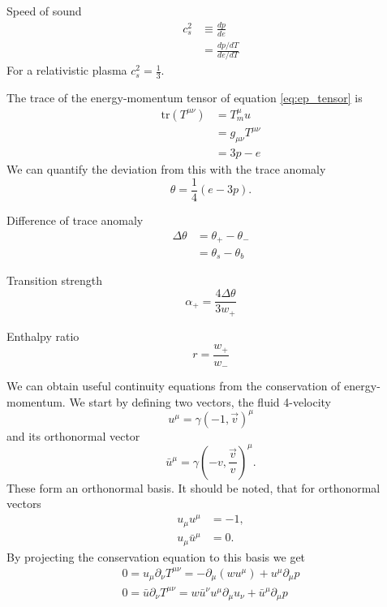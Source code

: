 Speed of sound
\cites[eq. 13]{giese_2020}[eq. 3]{giese_2021}
\begin{align}
c_s^2
&\equiv \frac{dp}{de} \\
&= \frac{dp/dT}{de/dT}
\end{align}
For a relativistic plasma $c_s^2=\frac{1}{3}$.

The trace of the energy-momentum tensor of equation \ref{eq:ep_tensor} is
\begin{align}
\text{tr} (T^{\mu \nu})
&= T^\mu_mu \\
&= g_{\mu \nu} T^{\mu \nu} \\
&=3p - e
\end{align}
We can quantify the deviation from this with the trace anomaly
\cites[eq. 7.24]{lecture_notes}[eq. 28]{giese_2020}
\begin{equation}
\theta = \frac{1}{4}(e-3p).
\end{equation}

Difference of trace anomaly
\begin{align}
\Delta \theta
&= \theta_+ - \theta_- \\
&= \theta_s - \theta_b
\end{align}

Transition strength
\begin{equation}
\alpha_+ = \frac{4 \Delta \theta}{3 w_+}
\end{equation}

Enthalpy ratio
\begin{equation}
r = \frac{w_+}{w_-}
\end{equation}

We can obtain useful continuity equations from the conservation of energy-momentum.
We start by defining two vectors, the fluid 4-velocity
\begin{equation}
u^\mu = \gamma(-1, \overrightarrow{v})^\mu
\end{equation}
and its orthonormal vector
\begin{equation}
\bar{u}^\mu = \gamma(-v, \frac{\overrightarrow{v}}{v})^\mu.
\end{equation}
These form an orthonormal basis.
It should be noted, that for orthonormal vectors
\begin{align}
u_\mu u^\mu &= -1, \\
u_\mu \bar{u}^\mu &= 0.
\end{align}
By projecting the conservation equation to this basis we get
\begin{align}
0 = u_\mu \partial_\nu T^{\mu \nu} = -\partial_\mu (w u^\mu) + u^\mu \partial_\mu p \\
0 = \bar{u} \partial_\nu T^{\mu \nu} = w \bar{u}^\nu u^\mu \partial_\mu u_\nu + \bar{u}^\mu \partial_\mu p
\end{align}

